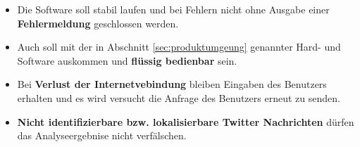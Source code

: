 \begin{itemize}
	\item Die Software soll stabil laufen und bei Fehlern nicht ohne Ausgabe einer \textbf{Fehlermeldung} geschlossen werden.
	\item Auch soll mit der in Abschnitt \ref{sec:produktumgeung} genannter Hard- und Software auskommen und \textbf{flüssig bedienbar} sein.
	\item Bei \textbf{Verlust der Internetvebindung} bleiben Eingaben des Benutzers erhalten und es wird versucht die Anfrage des Benutzers erneut zu senden.
	\item \textbf{Nicht identifizierbare bzw. lokalisierbare Twitter Nachrichten} dürfen das Analyseergebnise nicht verfälschen.
\end{itemize}
